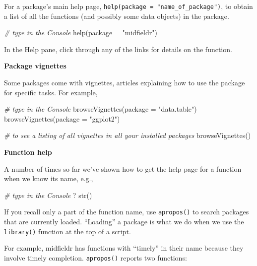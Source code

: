 \documentclass[
]{book}
\newenvironment{Shaded}{\begin{snugshade}}{\end{snugshade}}
\newcommand{\AttributeTok}[1]{\textcolor[rgb]{0.77,0.63,0.00}{#1}}
\newcommand{\CommentTok}[1]{\textcolor[rgb]{0.56,0.35,0.01}{\textit{#1}}}
\newcommand{\FunctionTok}[1]{\textcolor[rgb]{0.00,0.00,0.00}{#1}}
\newcommand{\NormalTok}[1]{#1}
\newcommand{\StringTok}[1]{\textcolor[rgb]{0.31,0.60,0.02}{#1}}
\begin{document}
For a package's main help page, \texttt{help(package\ =\ "name\_of\_package")}, to obtain a list of all the functions (and possibly some data objects) in the package.

\begin{Shaded}
\begin{Highlighting}[]
\CommentTok{\# type in the Console}
\FunctionTok{help}\NormalTok{(}\AttributeTok{package =} \StringTok{"midfieldr"}\NormalTok{)}
\end{Highlighting}
\end{Shaded}

In the Help pane, click through any of the links for details on the function.

\textbf{Package vignettes}

Some packages come with vignettes, articles explaining how to use the package for specific tasks. For example,

\begin{Shaded}
\begin{Highlighting}[]
\CommentTok{\# type in the Console}
\FunctionTok{browseVignettes}\NormalTok{(}\AttributeTok{package =} \StringTok{"data.table"}\NormalTok{)}
\FunctionTok{browseVignettes}\NormalTok{(}\AttributeTok{package =} \StringTok{"ggplot2"}\NormalTok{)}

\CommentTok{\# to see a listing of all vignettes in all your installed packages}
\FunctionTok{browseVignettes}\NormalTok{()}
\end{Highlighting}
\end{Shaded}

\textbf{Function help}

A number of times so far we've shown how to get the help page for a function when we know its name, e.g.,

\begin{Shaded}
\begin{Highlighting}[]
\CommentTok{\# type in the Console}
\NormalTok{? }\FunctionTok{str}\NormalTok{()}
\end{Highlighting}
\end{Shaded}

If you recall only a part of the function name, use \texttt{apropos()} to search packages that are currently loaded. ``Loading'' a package is what we do when we use the \texttt{library()} function at the top of a script.

For example, midfieldr has functions with ``timely'' in their name because they involve timely completion. \texttt{apropos()} reports two functions:
\end{document}
